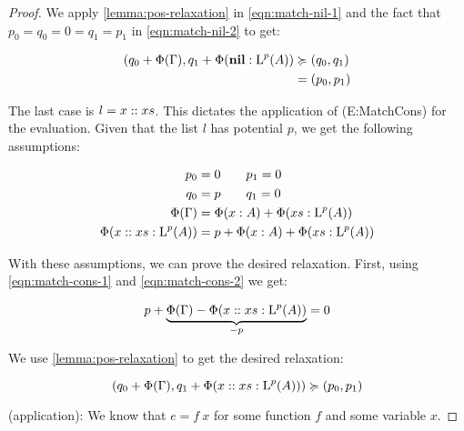 \begin{proof}
   We apply \cref{lemma:pos-relaxation} in \cref{eqn:match-nil-1} and the fact that \(p_0 = q_0 = 0 = q_1 = p_1\) in \cref{eqn:match-nil-2} to get: 
   
   \begin{align}
      (q_0 + \Phi(\Gamma), q_1 + \Phi(\listnil : \ralist{p}{A})   &\relaxation (q_0, q_1) \label{eqn:match-nil-1}\\
                                                                  &= (p_0, p_1) \label{eqn:match-nil-2}
   \end{align}

   The last case is \(l = x :: xs\). This dictates the application of (E:MatchCons) for the evaluation. Given that the list \(l\) has potential \(p\), we get the following assumptions:

   \begin{align}
      p_0            &= 0 \qquad p_1 = 0\nonumber\\
      q_0            &= p \qquad q_1 = 0\nonumber\\
      \Phi(\Gamma)   &= \Phi(x : A) + \Phi(xs : \ralist{p}{A})\label{eqn:match-cons-1}\\
      \Phi(\cons{x}{xs} : \ralist{p}{A}) &= p + \Phi(x : A) + \Phi(xs : \ralist{p}{A})\label{eqn:match-cons-2}
   \end{align}

   With these assumptions, we can prove the desired relaxation. First, using \cref{eqn:match-cons-1} and \cref{eqn:match-cons-2} we get:

   \begin{align}
      p + \underbrace{\Phi(\Gamma) - \Phi(x :: xs : \text{L}^{p}(A))}_{-p} = 0
   \end{align}

   We use \cref{lemma:pos-relaxation} to get the desired relaxation:

   \[
      (q_0 + \Phi(\Gamma), q_1 + \Phi(x :: xs : \text{L}^{p}(A))) \succcurlyeq (p_0, p_1)
   \]

   (application): We know that \(e = f~x\) for some function \(f\) and some variable \(x\). 
\end{proof}
 
